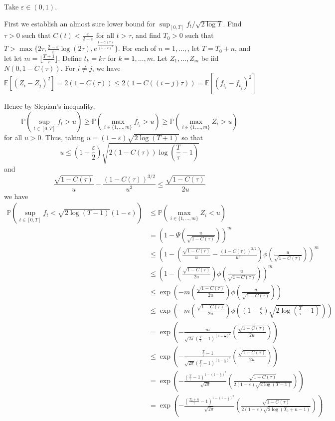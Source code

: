 \documentclass[11pt]{article}
\begin{document}
Take $\varepsilon \in (0,1)$.

First we establish an almost sure lower bound for $\sup_{[0,T]}f_t / \sqrt{2\log T}$.
Find $\tau > 0$ such that $C(t) <
\frac{\varepsilon}{2-\varepsilon}$ for all $t > \tau$, and find $T_0 > 0$ such that $T > \max\{ 2\tau,\frac{2-\varepsilon}{\varepsilon} \log(2\tau), e^{\frac{1-C(\tau)}{(1-\varepsilon)^2}}\}$.  For each of $n =
1,\hdots,$, let $T = T_0 + n$, and let let $m = \lfloor
\frac{T+1}{\tau} \rfloor$.  Define $t_k = k\tau$ for $k = 1,\hdots,m$.
Let $Z_1,\hdots, Z_m$ be iid $N(0,1-C(\tau))$.  For $i \neq j$, we have
\[
\mathbb{E}[(Z_i - Z_j)^2] = 2(1-C(\tau)) \leq 2(1-C((i-j)\tau)) = \mathbb{E}[(f_{t_i}-f_{t_j})^2]
\]

Hence by Slepian's inequality,
\[
\mathbb{P}(\sup_{t \in [0,T]} f_t > u) \geq
\mathbb{P}(\max_{i \in \{1,\hdots,m\}} f_{t_i} > u) \geq
\mathbb{P}(\max_{i \in \{1,\hdots,m\}} Z_i > u)\]
for all $u > 0$.
Thus, taking $u = (1-\varepsilon)\sqrt{2\log(T+1)}$
so that
\[
u \leq 
\left(1-\frac{\varepsilon}{2}\right) \sqrt{2(1-C(\tau)) \log\left(\frac{T}{\tau}-1\right)}
\]
and
\[
\frac{\sqrt{1-C(\tau)}}{u} - \frac{(1-C(\tau))^{3/2}}{u^3} \leq \frac{\sqrt{1-C(\tau)}}{2u}
\]
we have
\begin{align}
\mathbb{P}(\sup_{t \in [0,T]} f_t < \sqrt{2\log (T-1)}(1-\epsilon))
&\leq \mathbb{P}(\max_{i \in \{1,\hdots,m\}} Z_i < u)
\\&= \left(1-\Psi\left(\frac{u}{\sqrt{1-C(\tau)}}\right)\right)^m
\\&\leq \left(1-\left(\frac{\sqrt{1-C(\tau)}}{u} - \frac{(1-C(\tau))^{3/2}}{u^3}\right)\phi\left(\frac{u}{\sqrt{1-C(\tau)}}\right)\right)^m
\\&\leq \left(1-\left(\frac{\sqrt{1-C(\tau)}}{2u}\right)\phi\left(\frac{u}{\sqrt{1-C(\tau)}}\right)\right)^m
\\& \leq \exp\left(-m\left(\frac{\sqrt{1-C(\tau)}}{2u}\right)\phi\left(\frac{u}{\sqrt{1-C(\tau)}}\right)\right) 
\\& \leq \exp\left(-m\left(\frac{\sqrt{1-C(\tau)}}{2u}\right)\phi\left(\left(1-\frac{\varepsilon}{2}\right)\sqrt{2 \log\left(\frac{T}{\tau}-1\right)}\right)\right) 
\\& = \exp\left(-\frac{m}{\sqrt{2\pi}\left(\frac{T}{\tau}-1\right)^{(1-\frac{\varepsilon}{2})^2}}\left(\frac{\sqrt{1-C(\tau)}}{2u}\right)\right)
\\& \leq \exp\left(-\frac{\frac{T}{\tau}-1}{\sqrt{2\pi}\left(\frac{T}{\tau}-1\right)^{(1-\frac{\varepsilon}{2})^2}}\left(\frac{\sqrt{1-C(\tau)}}{2u}\right)\right)
\\& = \exp\left(-\frac{\left(\frac{T}{\tau}-1\right)^{1-(1-\frac{\varepsilon}{2})^2}}{\sqrt{2\pi}}\left(\frac{\sqrt{1-C(\tau)}}{2(1-\varepsilon)\sqrt{2\log(T-1)}}\right)\right)
\\& = \exp\left(-\frac{\left(\frac{T_0 + n}{\tau}-1\right)^{1-(1-\frac{\varepsilon}{2})^2}}{\sqrt{2\pi}}\left(\frac{\sqrt{1-C(\tau)}}{2(1-\varepsilon)\sqrt{2\log(T_0+n-1)}}\right)\right)
\end{align}
\end{document}
